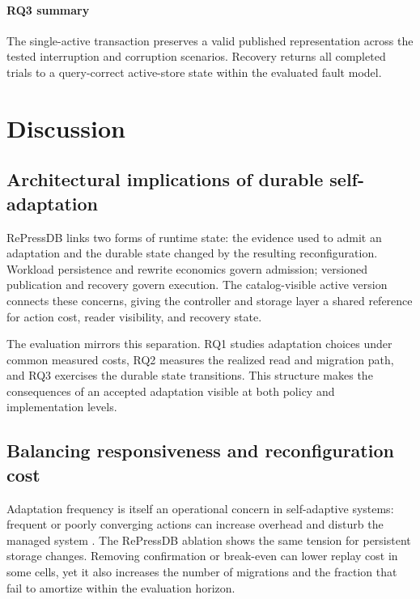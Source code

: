 \documentclass[final,5p,times,twocolumn,authoryear]{elsarticle}
\begin{document}
\paragraph{RQ3 summary}
The single-active transaction preserves a valid published representation across the tested interruption and corruption scenarios. Recovery returns all \CombinedRecoveryTrials{} completed trials to a query-correct active-store state within the evaluated fault model.

\FloatBarrier

\section{Discussion}
\label{sec:discussion}

\subsection{Architectural implications of durable self-adaptation}

RePressDB links two forms of runtime state: the evidence used to admit an adaptation and the durable state changed by the resulting reconfiguration. Workload persistence and rewrite economics govern admission; versioned publication and recovery govern execution. The catalog-visible active version connects these concerns, giving the controller and storage layer a shared reference for action cost, reader visibility, and recovery state.

The evaluation mirrors this separation. RQ1 studies adaptation choices under common measured costs, RQ2 measures the realized read and migration path, and RQ3 exercises the durable state transitions. This structure makes the consequences of an accepted adaptation visible at both policy and implementation levels.

\subsection{Balancing responsiveness and reconfiguration cost}

Adaptation frequency is itself an operational concern in self-adaptive systems: frequent or poorly converging actions can increase overhead and disturb the managed system \citep{salama2017stability,ayala2021prodspl}. The RePressDB ablation shows the same tension for persistent storage changes. Removing confirmation or break-even can lower replay cost in some cells, yet it also increases the number of migrations and the fraction that fail to amortize within the evaluation horizon.
\end{document}
